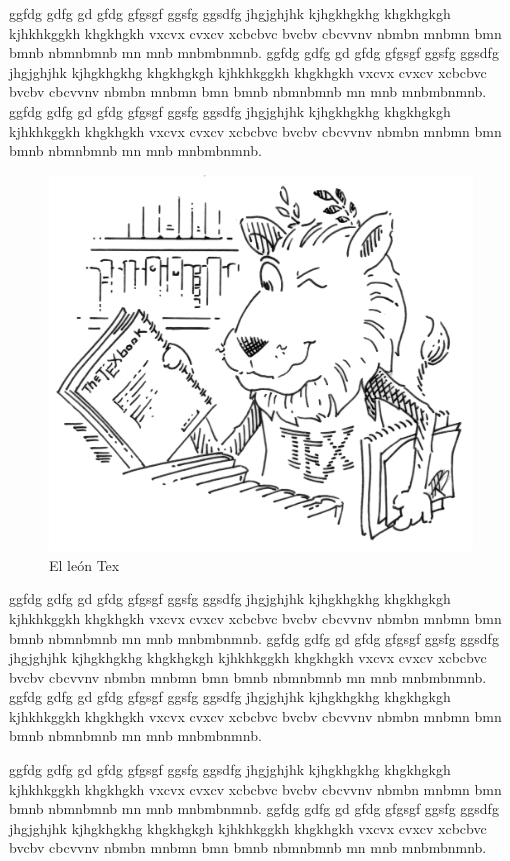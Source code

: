 \documentclass[a4paper,11pt]{article}
\begin{document}
\begin{minipage}{0.99\textwidth}
	
	ggfdg gdfg gd gfdg gfgsgf ggsfg ggsdfg jhgjghjhk kjhgkhgkhg khgkhgkgh kjhkhkggkh khgkhgkh vxcvx cvxcv xcbcbvc bvcbv cbcvvnv nbmbn mnbmn bmn bmnb nbmnbmnb mn mnb mnbmbnmnb.
	ggfdg gdfg gd gfdg gfgsgf ggsfg ggsdfg jhgjghjhk kjhgkhgkhg khgkhgkgh kjhkhkggkh khgkhgkh vxcvx cvxcv xcbcbvc bvcbv cbcvvnv nbmbn mnbmn bmn bmnb nbmnbmnb mn mnb mnbmbnmnb.
	ggfdg gdfg gd gfdg gfgsgf ggsfg ggsdfg jhgjghjhk kjhgkhgkhg khgkhgkgh kjhkhkggkh khgkhgkh vxcvx cvxcv xcbcbvc bvcbv cbcvvnv nbmbn mnbmn bmn bmnb nbmnbmnb mn mnb mnbmbnmnb.
	\begin{figure}
		\vspace{-5mm}
		\includegraphics[width=0.8\linewidth]{tex_lion}
		\caption{El león Tex}
		\label{fig:leontex2}
	\end{figure}
	ggfdg gdfg gd gfdg gfgsgf ggsfg ggsdfg jhgjghjhk kjhgkhgkhg khgkhgkgh kjhkhkggkh khgkhgkh vxcvx cvxcv xcbcbvc bvcbv cbcvvnv nbmbn mnbmn bmn bmnb nbmnbmnb mn mnb mnbmbnmnb.
	ggfdg gdfg gd gfdg gfgsgf ggsfg ggsdfg jhgjghjhk kjhgkhgkhg khgkhgkgh kjhkhkggkh khgkhgkh vxcvx cvxcv xcbcbvc bvcbv cbcvvnv nbmbn mnbmn bmn bmnb nbmnbmnb mn mnb mnbmbnmnb.
	ggfdg gdfg gd gfdg gfgsgf ggsfg ggsdfg jhgjghjhk kjhgkhgkhg khgkhgkgh kjhkhkggkh khgkhgkh vxcvx cvxcv xcbcbvc bvcbv cbcvvnv nbmbn mnbmn bmn bmnb nbmnbmnb mn mnb mnbmbnmnb.
	
	ggfdg gdfg gd gfdg gfgsgf ggsfg ggsdfg jhgjghjhk kjhgkhgkhg khgkhgkgh kjhkhkggkh khgkhgkh vxcvx cvxcv xcbcbvc bvcbv cbcvvnv nbmbn mnbmn bmn bmnb nbmnbmnb mn mnb mnbmbnmnb.
	ggfdg gdfg gd gfdg gfgsgf ggsfg ggsdfg jhgjghjhk kjhgkhgkhg khgkhgkgh kjhkhkggkh khgkhgkh vxcvx cvxcv xcbcbvc bvcbv cbcvvnv nbmbn mnbmn bmn bmnb nbmnbmnb mn mnb mnbmbnmnb.
	
	\end{minipage}
	
\end{document}
